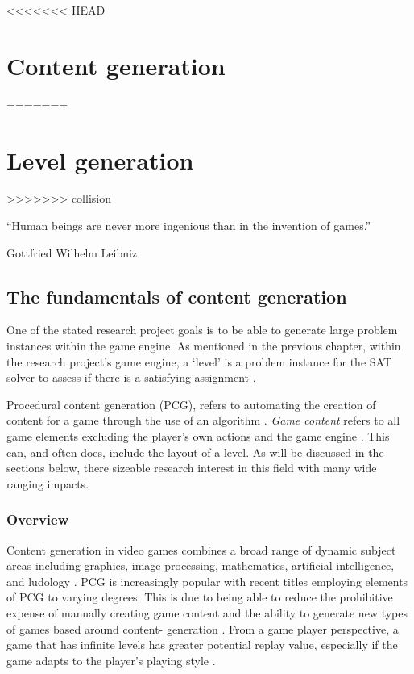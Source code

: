 \documentclass[11pt, a4paper, oneside]{report} %
\begin{document}
<<<<<<< HEAD
\chapter{Content generation}
=======
\chapter{Level generation}
>>>>>>> collision


\epigraph{``Human beings are never more ingenious than in the invention of
games.''}{Gottfried Wilhelm Leibniz}


\section{The fundamentals of content generation}

One of the stated research project goals is to be able to generate large problem
instances within the game engine. As mentioned in the previous chapter, within
the research project's game engine, a `level' is a problem instance for the SAT
solver to assess if there is a satisfying assignment \cite{Aloupis2012} .

Procedural content generation (PCG), refers to automating the creation of
content for a game through the use of an algorithm
\cite{Hendrikx:2013:PCG:2422956.2422957, 5756645}. \textit{Game content} refers
to all game elements excluding the player's own actions and the game engine
\cite{Burgun:2012}. This can, and often does, include the layout of a level. As
will be discussed in the sections below, there sizeable research interest in
this field with many wide ranging impacts.

\subsection{Overview}

Content generation in video games combines a broad range of dynamic subject
areas including graphics, image processing, mathematics, artificial
intelligence, and ludology \cite{Hendrikx:2013:PCG:2422956.2422957}. PCG is
increasingly popular with recent titles employing elements of PCG to varying
degrees. This is due to being able to reduce the prohibitive expense of manually
creating game content \cite{Hendrikx:2013:PCG:2422956.2422957} and the ability
to generate new types of games based around content- generation \cite{5756645}.
From a game player perspective, a game that has infinite levels has greater
potential replay value, especially if the game adapts to the player's playing
style \cite{6424299}.
\end{document}
